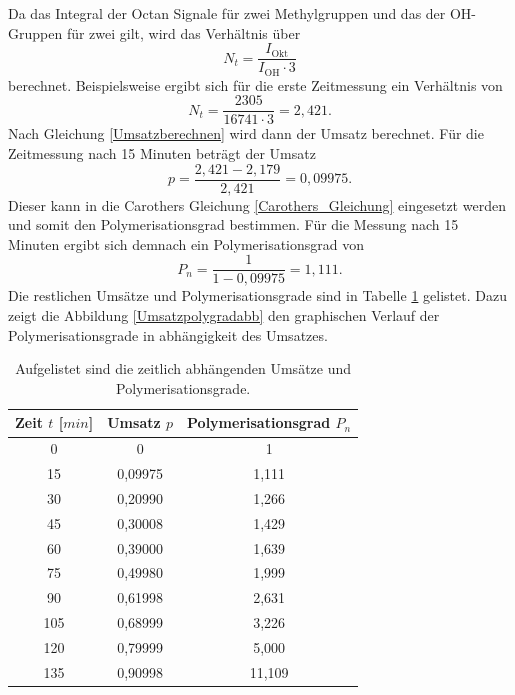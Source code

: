 \documentclass[10pt,a4paper,ngerman]{scrartcl}
\begin{document}
		Da das Integral der Octan Signale für zwei Methylgruppen und das der OH-Gruppen für zwei gilt, wird das Verhältnis über 
		\begin{equation}
			N_t = \frac{I_\text{Okt}}{I_\text{OH} \cdot 3}
		\end{equation}
		berechnet. Beispielsweise ergibt sich für die erste Zeitmessung ein Verhältnis von
		\begin{equation*}
			N_t = \frac{2305}{16741 \cdot 3} = 2,421 \text{.}
		\end{equation*}
		Nach Gleichung \ref{Umsatzberechnen} wird dann der Umsatz berechnet. Für die Zeitmessung nach 15 Minuten beträgt der Umsatz
		\begin{equation*}
			p = \frac{2,421 - 2,179}{2,421} = 0,09975 \text{.}
		\end{equation*}
		Dieser kann in die Carothers Gleichung \ref{Carothers_Gleichung} eingesetzt werden und somit den Polymerisationsgrad bestimmen. 
		Für die Messung nach 15 Minuten ergibt sich demnach ein Polymerisationsgrad von
		\begin{equation*}
			P_n = \frac{1}{1-0,09975} = 1,111 \text{.}
		\end{equation*}
		Die restlichen Umsätze und Polymerisationsgrade sind in Tabelle \ref{Umsatzpolygradtab} gelistet. Dazu zeigt die Abbildung \ref{Umsatzpolygradabb} den graphischen 
		Verlauf der Polymerisationsgrade in abhängigkeit des Umsatzes.

		\begin{table}[H]
    	\begin{center}
        	\caption{Aufgelistet sind die zeitlich abhängenden Umsätze und Polymerisationsgrade.}
        	\label{Umsatzpolygradtab}
            	\begin{tabular}{c|c|c}
					\hline
					Zeit $t$ [$min$]& Umsatz $p$ & Polymerisationsgrad $P_n$ \\
					\hline 
					0	&	0	&1 \\
					15	&	0,09975	&1,111 \\
					30	&	0,20990	&1,266\\
					45	&	0,30008	&1,429\\
					60	&	0,39000	&1,639\\
					75	&	0,49980	&1,999\\
					90	&	0,61998	&2,631\\
					105	&	0,68999	&3,226\\
					120	&	0,79999	&5,000\\
					135	&	0,90998	&11,109\\
				\end{tabular}
		\end{center}
		\end{table}
\end{document}
